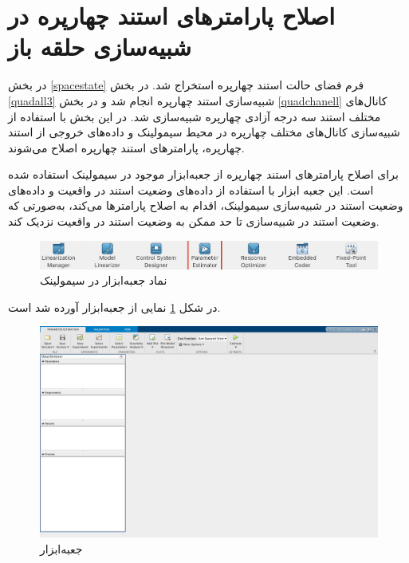 \section{اصلاح پارامتر‌های  استند چهارپره در شبیه‌سازی حلقه باز}
در بخش
\ref{spacestate}
فرم فضای حالت استند چهارپره استخراج شد. در بخش
\ref{quadall3}
شبیه‌سازی استند چهارپره انجام شد و در بخش
\ref{quadchanell}
کانال‌های مختلف استند سه درجه آزادی چهارپره شبیه‌سازی شد.
در این بخش با استفاده از شبیه‌سازی کانال‌های مختلف چهارپره در محیط سیمولینک و داده‌های خروجی  از استند چهارپره، پارامترهای استند چهارپره اصلاح می‌شوند.

برای اصلاح پارامترهای استند چهارپره از جعبه‌ابزار
موجود در سیمولینک
استفاده شده است.
این جعبه ابزار با استفاده از داده‌های وضعیت استند در واقعیت و داده‌های وضعیت استند در شبیه‌سازی سیمولینک، اقدام به اصلاح پارامترها می‌کند، به‌صورتی که وضعیت استند در شبیه‌سازی تا حد ممکن به  وضعیت استند در واقعیت نزدیک کند.



\begin{figure}[H]
	\includegraphics[width=12cm]{../../Figures/QuadSimulation/ParameterEstimation/PS_icon.png}
	\centering
	\caption{نماد جعبه‌ابزار
در سیمولینک}
\end{figure}
در شکل
\ref{PS}
نمایی از جعبه‌ابزار
 آورده شد است.





\begin{figure}[H]
	\includegraphics[width=12cm]{../../Figures/QuadSimulation/ParameterEstimation/PS_app.png}
	\centering
	\caption{جعبه‌ابزار
	}
	\label{PS}
\end{figure}

